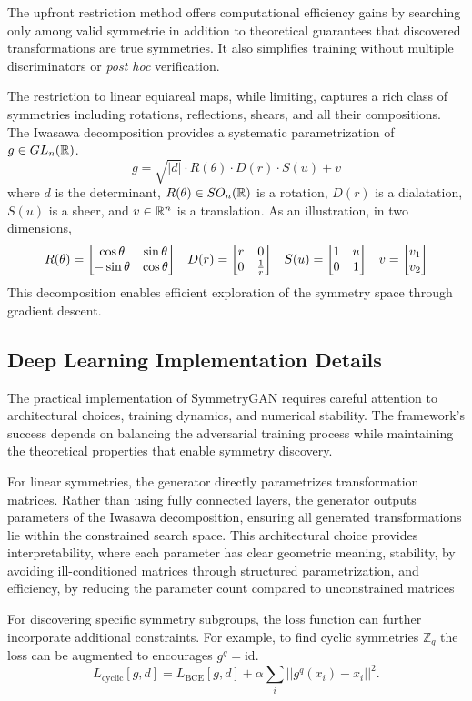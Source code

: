     The upfront restriction method offers computational efficiency gains by searching only among valid symmetrie in addition to theoretical guarantees that discovered transformations are true symmetries.
    It also simplifies training without multiple discriminators or \textit{post hoc} verification.

    The restriction to linear equiareal maps, while limiting, captures a rich class of symmetries including rotations, reflections, shears, and all their compositions.
    The Iwasawa decomposition\kd{} provides a systematic parametrization of \(g\in GL_n(\mathbb{R})\).
    \[
        g = \sqrt{|d|} \cdot R(\theta) \cdot D(r) \cdot S(u) + v
    \]
    where \(d\) is the determinant, \(R(\theta)\in SO_n(\mathbb{R})\) is a rotation, \(D(r)\) is a dialatation, \(S(u)\) is a sheer, and \(v\in\mathbb{R}^n\) is a translation.
    As an illustration, in two dimensions,
    \[
        R(\theta) = \mqty[\cos\theta&\sin\theta\\-\sin\theta&\cos\theta] \quad D(r) = \mqty[r&0\\0&\frac1r] \quad S(u) = \mqty[1 & u\\0&1]\quad v = \mqty[v_1\\v_2]
    \]
    This decomposition enables efficient exploration of the symmetry space through gradient descent.

    \subsection{Deep Learning Implementation Details}
    The practical implementation of SymmetryGAN requires careful attention to architectural choices, training dynamics, and numerical stability.
    The framework's success depends on balancing the adversarial training process while maintaining the theoretical properties that enable symmetry discovery.
    
    For linear symmetries, the generator directly parametrizes transformation matrices.
    Rather than using fully connected layers, the generator outputs parameters of the Iwasawa decomposition, ensuring all generated transformations lie within the constrained search space.
    This architectural choice provides interpretability, where each parameter has clear geometric meaning, stability, by avoiding ill-conditioned matrices through structured parametrization, and efficiency, by reducing the parameter count compared to unconstrained matrices

    For discovering specific symmetry subgroups, the loss function can further incorporate additional constraints.
    For example, to find cyclic symmetries \(\mathbb{Z}_q\) the loss can be augmented to encourages \(g^q = \text{id}\).
    \[
        L_{\text{cyclic}}[g,d] = L_{\text{BCE}}[g,d] + \alpha \sum_{i} ||g^q(x_i) - x_i||^2.
    \]

